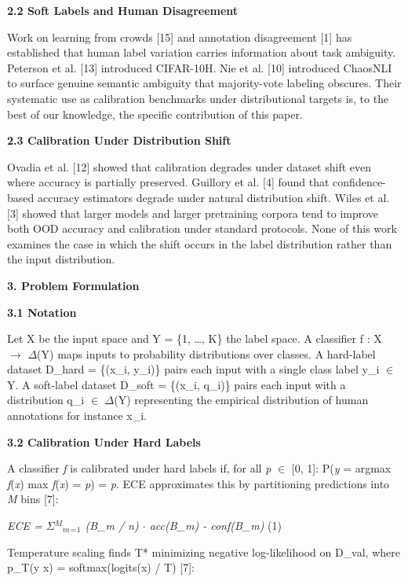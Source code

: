 \documentclass[11pt]{article}
\begin{document}
\textbf{2.2 Soft Labels and Human Disagreement}

Work on learning from crowds {[}15{]} and annotation disagreement
{[}1{]} has established that human label variation carries information
about task ambiguity. Peterson et al. {[}13{]} introduced CIFAR-10H. Nie
et al. {[}10{]} introduced ChaosNLI to surface genuine semantic
ambiguity that majority-vote labeling obscures. Their systematic use as
calibration benchmarks under distributional targets is, to the best of
our knowledge, the specific contribution of this paper.

\textbf{2.3 Calibration Under Distribution Shift}

Ovadia et al. {[}12{]} showed that calibration degrades under dataset
shift even where accuracy is partially preserved. Guillory et al.
{[}4{]} found that confidence-based accuracy estimators degrade under
natural distribution shift. Wiles et al. {[}3{]} showed that larger
models and larger pretraining corpora tend to improve both OOD accuracy
and calibration under standard protocols. None of this work examines the
case in which the shift occurs in the label distribution rather than the
input distribution.

\textbf{3. Problem Formulation}

\textbf{3.1 Notation}

Let X be the input space and Y = \{1, \ldots, K\} the label space. A
classifier f : X $\rightarrow$ $\Delta$(Y) maps inputs to probability distributions over
classes. A hard-label dataset D\_hard = \{(x\_i, y\_i)\} pairs each
input with a single class label y\_i $\in$ Y. A soft-label dataset D\_soft =
\{(x\_i, q\_i)\} pairs each input with a distribution q\_i $\in$ $\Delta$(Y)
representing the empirical distribution of human annotations for
instance x\_i.

\textbf{3.2 Calibration Under Hard Labels}

A classifier \emph{f} is calibrated under hard labels if, for all
\emph{p} $\in$ {[}0, 1{]}: P(\emph{y} = argmax \emph{f}(\emph{x}) \textbar{}
max \emph{f}(\emph{x}) = \emph{p}) = \emph{p}. ECE approximates this by
partitioning predictions into \emph{M} bins {[}7{]}:

\emph{ECE = $\Sigma$$^M$$_m$$_=$$_1$ (\textbar B\_m\textbar{} / n) $\cdot$ \textbar acc(B\_m) -
conf(B\_m)\textbar{}} (1)

Temperature scaling finds T* minimizing negative log-likelihood on
D\_val, where p\_T(y \textbar{} x) = softmax(logits(x) / T) {[}7{]}:
\end{document}
